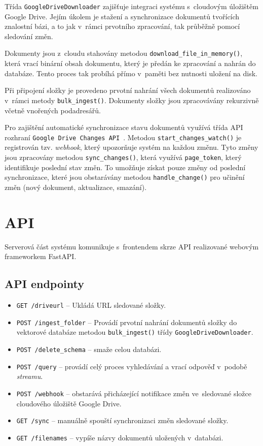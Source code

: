 Třída \texttt{GoogleDriveDownloader} zajišťuje integraci systému s~cloudovým úložištěm Google Drive. Jejím úkolem je stažení a synchronizace dokumentů tvořících znalostní bázi, a to jak v~rámci prvotního zpracování, tak průběžně pomocí sledování změn.

Dokumenty jsou z~cloudu stahovány metodou \texttt{download\_file\_in\_memory()}, která vrací binární obsah dokumentu, který je předán ke zpracování a nahrán do databáze. Tento proces tak probíhá přímo v~paměti bez nutnosti uložení na disk. 

Při připojení složky je provedeno prvotní nahrání všech dokumentů realizováno v~rámci metody \texttt{bulk\_ingest()}. Dokumenty složky jsou zpracovávány rekurzivně včetně vnořených podadresářů.

Pro zajištění automatické synchronizace stavu dokumentů využívá třída API rozhraní \texttt{Google Drive Changes API}~\cite{googledriveapi}. Metodou \texttt{start\_changes\_watch()} je registrován tzv. \textit{webhook}, který upozorňuje systém na každou změnu. Tyto změny jsou zpracovány metodou \texttt{sync\_changes()}, která využívá \texttt{page\_token}, který identifikuje poslední stav změn. To umožňuje získat pouze změny od poslední synchronizace, které jsou obstarávány metodou \texttt{handle\_change()} pro učinění změn (nový dokument, aktualizace, smazání).

\newpage

\section{API}
Serverová část systému komunikuje s~frontendem skrze API realizované webovým frameworkem FastAPI. 

\subsection{API endpointy}
\begin{itemize}
    \item \texttt{GET /driveurl} – Ukládá URL sledované složky.
    \item \texttt{POST /ingest\_folder} – Provádí prvotní nahrání dokumentů složky do vektorové databáze metodou \texttt{bulk\_ingest()} třídy \texttt{GoogleDriveDownloader}.
    \item \texttt{POST /delete\_schema} – smaže celou databázi.
    \item \texttt{POST /query} – provádí celý proces vyhledávání a vrací odpověď v~podobě \textit{streamu}.
    \item \texttt{POST /webhook} – obstarává přicházející notifikace změn ve~sledované složce cloudového úložiště Google Drive.
    \item \texttt{GET /sync} – manuálně spouští synchronizaci změn sledované složky.
    \item \texttt{GET /filenames} – vypíše názvy dokumentů uložených v~databázi.
\end{itemize}

